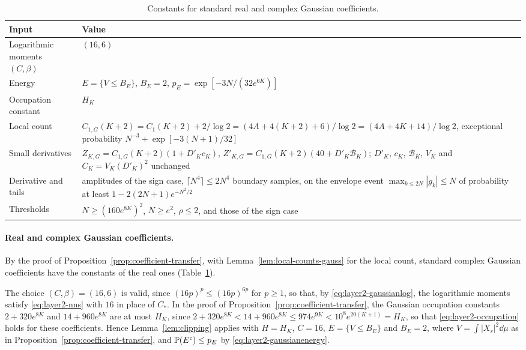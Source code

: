 \begin{table}[!ht]
\centering
\small
\begin{tabular}{@{}>{\raggedright\arraybackslash}p{}
>{\raggedright\arraybackslash}p{}@{}}
\toprule
Input & Value\\
\midrule
Logarithmic moments $(C,\beta)$ & $(16,6)$\\
Energy & $E=\{V\le B_E\}$, $B_E=2$,
 $p_E=\exp[-3N/(32e^{6K})]$\\
Occupation constant & $H_K$\\
Local count & $C_{1,G}(K+2)=C_1(K+2)+2/\log2
 =(4A+4(K+2)+6)/\log2=(4A+4K+14)/\log2$,
 exceptional probability $N^{-3}+\exp[-3(N+1)/32]$\\
Small derivatives & $Z_{K,G}=C_{1,G}(K+2)(1+D'_Kc_K)$,
 $Z'_{K,G}=C_{1,G}(K+2)(40+D'_K\mathcal B_K)$; $D'_K$, $c_K$,
 $\mathcal B_K$, $V_K$ and $C_K=V_K(D'_K)^2$ unchanged\\
Derivative and tails & amplitudes of the sign case,
 $\lceil N^4\rceil\le2N^4$ boundary samples, on the envelope event
 $\max_{k\le2N}|g_k|\le N$ of probability at least
 $1-2(2N+1)e^{-N^2/2}$\\
Thresholds & $N\ge(160e^{8K})^2$, $N\ge e^2$, $\rho\le2$, and those of
 the sign case\\
\bottomrule
\end{tabular}
\caption{Constants for standard real and complex Gaussian coefficients.}
\label{tab:law-gaussian}
\end{table}

\paragraph{Real and complex Gaussian coefficients.}
By the proof of Proposition~\ref{prop:coefficient-transfer}, with
Lemma~\ref{lem:local-counts-gauss} for the local count, standard complex
Gaussian coefficients have the constants of the real ones
(Table~\ref{tab:law-gaussian}).

The choice $(C,\beta)=(16,6)$ is valid, since $(16p)^p\le(16p)^{6p}$ for
$p\ge1$, so that, by \eqref{eq:layer2-gaussianlog}, the logarithmic
moments satisfy \eqref{eq:layer2-nns} with $16$ in place of $C_*$.
In the proof of Proposition~\ref{prop:coefficient-transfer}, the Gaussian
occupation constants $2+320e^{8K}$ and $14+960e^{8K}$ are at most $H_K$,
since $2+320e^{8K}<14+960e^{8K}\le974e^{9K}<10^8e^{20(K+1)}=H_K$, so that
\eqref{eq:layer2-occupation} holds for these coefficients.
Hence Lemma~\ref{lem:clipping} applies with $H=H_K$, $C=16$,
$E=\{V\le B_E\}$ and $B_E=2$, where $V=\int|X_r|^2\dd\mu$ as in
Proposition~\ref{prop:coefficient-transfer}, and $\mathbb P(E^c)\le p_E$ by
\eqref{eq:layer2-gaussianenergy}.


